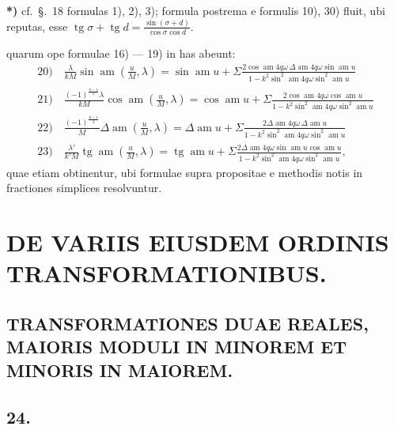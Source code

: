 \documentclass{article}
\begin{document}
\textbf{*)} cf.\ §.\ 18 formulas 1), 2), 3); formula postrema e formulis 10), 30) fluit, ubi reputas, esse $\operatorname{tg}\sigma+\operatorname{tg}d=\frac{\sin(\sigma+d)}{\cos\sigma\cos d}$.

quarum ope formulae 16) --- 19) in has abeunt:
\[
\begin{gathered}
\text{20)}\quad\frac{\lambda}{kM}\sin\operatorname{am}\left(\frac{u}{M},\lambda\right)=\sin\operatorname{am}u+\Sigma\frac{2\cos\operatorname{am}4q\omega\,\Delta\operatorname{am}4q\omega\sin\operatorname{am}u}{1-k^{2}\sin^{2}\operatorname{am}4q\omega\sin^{2}\operatorname{am}u}\\[1.5ex]
\text{21)}\quad\frac{(-1)^{\frac{n-1}{2}}\lambda}{kM}\cos\operatorname{am}\left(\frac{u}{M},\lambda\right)=\cos\operatorname{am}u+\Sigma\frac{2\cos\operatorname{am}4q\omega\cos\operatorname{am}u}{1-k^{2}\sin^{2}\operatorname{am}4q\omega\sin^{2}\operatorname{am}u}\\[1.5ex]
\text{22)}\quad\frac{(-1)^{\frac{n-1}{2}}}{M}\Delta\operatorname{am}\left(\frac{u}{M},\lambda\right)=\Delta\operatorname{am}u+\Sigma\frac{2\Delta\operatorname{am}4q\omega\,\Delta\operatorname{am}u}{1-k^{2}\sin^{2}\operatorname{am}4q\omega\sin^{2}\operatorname{am}u}\\[1.5ex]
\text{23)}\quad\frac{\lambda'}{k'M}\operatorname{tg}\operatorname{am}\left(\frac{u}{M},\lambda\right)=\operatorname{tg}\operatorname{am}u+\Sigma\frac{2\Delta\operatorname{am}4q\omega\sin\operatorname{am}u\cos\operatorname{am}u}{1-k^{2}\sin^{2}\operatorname{am}4q\omega\sin^{2}\operatorname{am}u},
\end{gathered}
\]
quae etiam obtinentur, ubi formulae supra propositae e methodis notis in fractiones simplices resolvuntur.

\section*{DE VARIIS EIUSDEM ORDINIS TRANSFORMATIONIBUS.}

\subsection*{TRANSFORMATIONES DUAE REALES, MAIORIS MODULI IN MINOREM ET MINORIS IN MAIOREM.}

\subsection*{24.}
\end{document}
